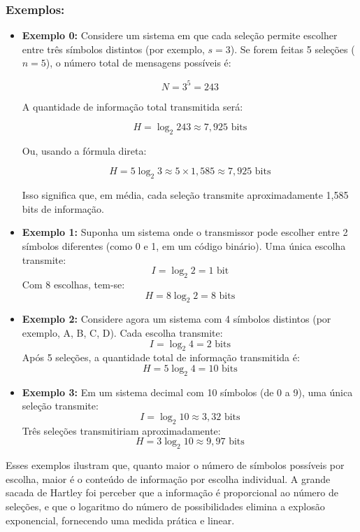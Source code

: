 \subsubsection*{Exemplos:}

\begin{itemize}
\item \textbf{Exemplo 0:} Considere um sistema em que cada seleção permite escolher entre três símbolos distintos (por exemplo, \( s = 3 \)). Se forem feitas 5 seleções (\( n = 5 \)), o número total de mensagens possíveis é:

	\[
	N = 3^5 = 243
	\]

	A quantidade de informação total transmitida será:

	\[
	H = \log_2 243 \approx 7{,}925 \text{ bits}
	\]

	Ou, usando a fórmula direta:

	\[
	H = 5 \log_2 3 \approx 5 \times 1{,}585 \approx 7{,}925 \text{ bits}
	\]

	Isso significa que, em média, cada seleção transmite aproximadamente 1,585 bits de informação.

    \item \textbf{Exemplo 1:} Suponha um sistema onde o transmissor pode escolher entre 2 símbolos diferentes (como 0 e 1, em um código binário). Uma única escolha transmite:
    \[
    I = \log_2 2 = 1 \text{ bit}
    \]
    Com 8 escolhas, tem-se:
    \[
    H = 8 \log_2 2 = 8 \text{ bits}
    \]

    \item \textbf{Exemplo 2:} Considere agora um sistema com 4 símbolos distintos (por exemplo, A, B, C, D). Cada escolha transmite:
    \[
    I = \log_2 4 = 2 \text{ bits}
    \]
    Após 5 seleções, a quantidade total de informação transmitida é:
    \[
    H = 5 \log_2 4 = 10 \text{ bits}
    \]

    \item \textbf{Exemplo 3:} Em um sistema decimal com 10 símbolos (de 0 a 9), uma única seleção transmite:
    \[
    I = \log_2 10 \approx 3{,}32 \text{ bits}
    \]
    Três seleções transmitiriam aproximadamente:
    \[
    H = 3 \log_2 10 \approx 9{,}97 \text{ bits}
    \]
\end{itemize}

Esses exemplos ilustram que, quanto maior o número de símbolos possíveis por escolha, maior é o conteúdo de informação por escolha individual. A grande sacada de Hartley foi perceber que a informação é proporcional ao número de seleções, e que o logaritmo do número de possibilidades elimina a explosão exponencial, fornecendo uma medida prática e linear.

